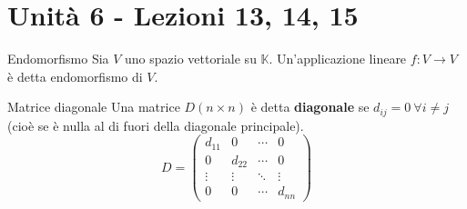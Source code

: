 \documentclass[a4paper]{article}
\theoremstyle{definition}
\begin{document}
	\section{Unità 6  - Lezioni 13, 14, 15}
	\begin{deff}{Endomorfismo}{}
		Sia $V$ uno spazio vettoriale su $\mathbb{K}$. Un'applicazione lineare $f: V \to V$ è detta endomorfismo di $V$.
	\end{deff}
	\begin{deff}{Matrice diagonale}{}
		Una matrice $D (n \times n)$ è detta \textbf{diagonale} se $d_{ij} = 0 \ \forall i \ne j$ (cioè se è nulla al di fuori della diagonale principale).
		\begin{equation*}
			D = \begin{pmatrix}
				d_{11} & 0 & \cdots & 0 \\
				0 & d_{22} & \cdots & 0 \\
				\vdots & \vdots & \ddots & \vdots \\
				0 & 0 & \cdots & d_{nn}
			\end{pmatrix}
		\end{equation*}
	\end{deff}
\end{document}

